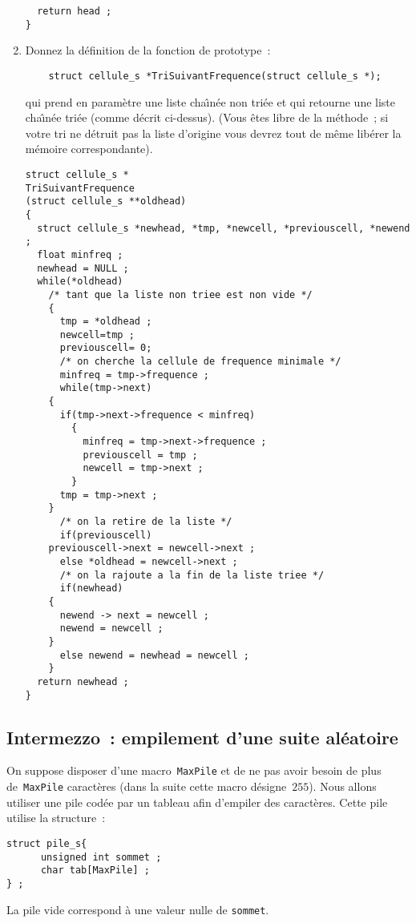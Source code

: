 \begin{enumerate}
\begin{correction}
\begin{verbatim}
  return head ;
}
\end{verbatim}
  \end{correction}
\fi
 \item Donnez la d\'efinition de la fonction de prototype~:
\begin{verbatim}
    struct cellule_s *TriSuivantFrequence(struct cellule_s *);
\end{verbatim}
   qui prend en param\`etre une liste cha\^\i{}n\'ee non tri\'ee et
   qui retourne une liste cha\^\i{}n\'ee tri\'ee (comme d\'ecrit
   ci-dessus). (Vous \^etes libre de la m\'ethode~; si votre tri ne
   d\'etruit pas la liste d'origine vous devrez tout de m\^eme
   lib\'erer la m\'emoire correspondante).
\ifcorrection
   \begin{correction}
\begin{verbatim}
struct cellule_s *
TriSuivantFrequence
(struct cellule_s **oldhead)
{
  struct cellule_s *newhead, *tmp, *newcell, *previouscell, *newend ;
  float minfreq ;
  newhead = NULL ;
  while(*oldhead)
    /* tant que la liste non triee est non vide */
    {
      tmp = *oldhead ;
      newcell=tmp ;
      previouscell= 0;
      /* on cherche la cellule de frequence minimale */
      minfreq = tmp->frequence ;	  
      while(tmp->next) 
	{
	  if(tmp->next->frequence < minfreq)
	    {
	      minfreq = tmp->next->frequence ;	  
	      previouscell = tmp ;
	      newcell = tmp->next ;
	    }
	  tmp = tmp->next ;
	} 
      /* on la retire de la liste */
      if(previouscell)
	previouscell->next = newcell->next ;
      else *oldhead = newcell->next ;
      /* on la rajoute a la fin de la liste triee */
      if(newhead)
	{
	  newend -> next = newcell ;
	  newend = newcell ;
	}
      else newend = newhead = newcell ;
    }
  return newhead ;
}
\end{verbatim}
   \end{correction}
\fi
\end{enumerate}
\subsection{Intermezzo~: empilement d'une suite al\'eatoire}
\label{sec:pileentier}
On suppose disposer d'une macro~\verb+MaxPile+ et de ne pas avoir
besoin de plus de~\verb+MaxPile+ caract\`eres (dans la suite cette
macro d\'esigne~$255$).  Nous allons utiliser une pile cod\'ee par un
tableau afin d'empiler des caract\`eres.  Cette pile utilise la
structure~:
\begin{verbatim}
struct pile_s{
      unsigned int sommet ;
      char tab[MaxPile] ;
} ;
\end{verbatim}
La pile vide correspond \`a une valeur nulle de \texttt{sommet}.

